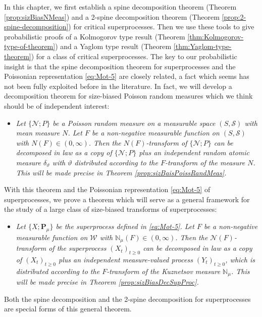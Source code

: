 \par
	In this chapter, we first establish a spine decomposition theorem
	(Theorem \ref{prop:sizBiasNMeas}) and a 2-spine decomposition theorem
	(Theorem \ref{prop:2-spine-decomposition}) for critical superprocesses.
	Then we use these tools to give probabilistic proofs of a Kolmogorov type result (Theorem \ref{thm:Kolmogorov-type-of-theorem}) and a Yaglom type result (Theorem \ref{thm:Yaglom-type-theorem}) for a class of critical superprocesses.
	The key to our probabilistic insight is that the spine decomposition theorem for superprocesses and the Poissonian representation \eqref{eq:Mot-5} are closely related, a fact which seems has not been fully exploited before in the literature.
	In fact, we will develop a decomposition theorem for size-biased Poisson random measures which we think should be of independent interest:
\begin{itemize}
\item
	\emph{Let $\{\mathcal N;P\}$ be a Poisson random measure on a measurable space $(S, \mathscr S)$ with mean measure $N$.
	Let $F$ be a non-negative measurable function on $(S, \mathscr S)$ with $N(F)\in (0, \infty)$.
	Then the $N(F)$-transform of $\{\mathcal N;P\}$ can be decomposed in law as a copy of $\{\mathcal N;P\}$ plus an independent random atomic measure $\delta_\vartheta$ with $\vartheta$ distributed according to the $F$-transform of the measure $N$.
This will be made precise in Theorem \ref{prop:sizBaisPoissRandMeas}.}
\end{itemize}
\par
	With this theorem and the Poissonian representation \eqref{eq:Mot-5} of superprocesses, we prove a theorem which will serve as a general framework for the study of a large class of size-biased transforms of superprocesses:
\begin{itemize}
\item
	\emph{Let $\{X;\mathbf P_\mu\}$ be the superprocess defined in \eqref{eq:Mot-5}.
	Let $F$ be a non-negative measurable function on $\mathcal W$ with $\mathbb N_\mu(F)\in(0,\infty)$.
	Then the $\mathcal N(F)$-transform of the superprocess $(X_t)_{t\geq 0}$ can be decomposed in law as a copy of $(X_t)_{t\geq 0}$ plus an independent measure-valued process $(Y_t)_{t\geq 0}$, which is distributed according to the $F$-transform of the Kuznetsov measure $\mathbb N_\mu$.
	This will be made precise in Theorem \ref{prop:sizBiasDecSupProc}.}
\end{itemize}
\par
	Both the spine decomposition and the 2-spine decomposition for superprocesses are special forms of this general theorem.
